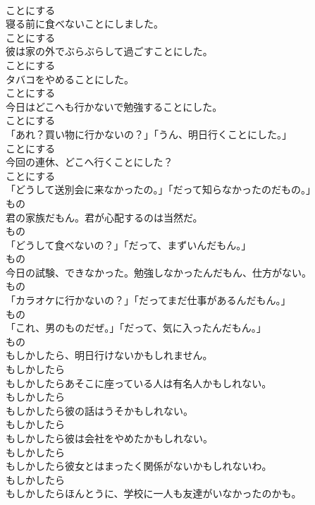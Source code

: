 \documentclass[8pt]{extreport}
\begin{document}
\begin{CJK}{UTF8}{min}
\\	ことにする
\\	寝る前に食べないことにしました。	
\\	ことにする
\\	彼は家の外でぶらぶらして過ごすことにした。	
\\	ことにする
\\	タバコをやめることにした。	
\\	ことにする
\\	今日はどこへも行かないで勉強することにした。	
\\	ことにする
\\	「あれ？買い物に行かないの？」「うん、明日行くことにした。」	
\\	ことにする
\\	今回の連休、どこへ行くことにした？	
\\	ことにする
\\	「どうして送別会に来なかったの。」「だって知らなかったのだもの。」	
\\	もの
\\	君の家族だもん。君が心配するのは当然だ。	
\\	もの
\\	「どうして食べないの？」「だって、まずいんだもん。」	
\\	もの
\\	今日の試験、できなかった。勉強しなかったんだもん、仕方がない。	
\\	もの
\\	「カラオケに行かないの？」「だってまだ仕事があるんだもん。」	
\\	もの
\\	「これ、男のものだぜ。」「だって、気に入ったんだもん。」	
\\	もの
\\	もしかしたら、明日行けないかもしれません。	
\\	もしかしたら
\\	もしかしたらあそこに座っている人は有名人かもしれない。	
\\	もしかしたら
\\	もしかしたら彼の話はうそかもしれない。	
\\	もしかしたら
\\	もしかしたら彼は会社をやめたかもしれない。	
\\	もしかしたら
\\	もしかしたら彼女とはまったく関係がないかもしれないわ。	
\\	もしかしたら
\\	もしかしたらほんとうに、学校に一人も友達がいなかったのかも。	

\end{CJK}
\end{document}
